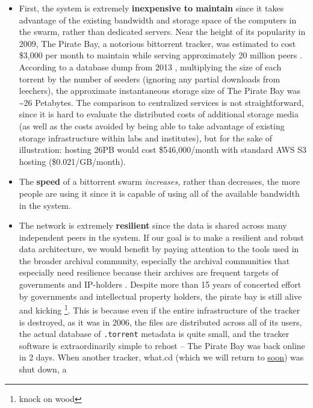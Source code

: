 \documentclass[10pt]{article}
\begin{document}
\begin{multicols}{2}
\begin{itemize}
\item
  First, the system is extremely \textbf{inexpensive to maintain} since
  it takes advantage of the existing bandwidth and storage space of the
  computers in the swarm, rather than dedicated servers. Near the height
  of its popularity in 2009, The Pirate Bay, a notorious bittorrent
  tracker, was estimated to cost \$3,000 per month to maintain while
  serving approximately 20 million peers \cite{roettgersPirateBayDistributing2009} . According to a database dump
  from 2013 \cite{PirateBayArchiveteam2020} , multiplying the
  size of each torrent by the number of seeders (ignoring any partial
  downloads from leechers), the approximate instantaneous storage size
  of The Pirate Bay was \textasciitilde26 Petabytes. The comparison to
  centralized services is not straightforward, since it is hard to
  evaluate the distributed costs of additional storage media (as well as
  the costs avoided by being able to take advantage of existing storage
  infrastructure within labs and institutes), but for the sake of
  illustration: hosting 26PB would cost \$546,000/month with standard
  AWS S3 hosting (\$0.021/GB/month).
\item
  The \textbf{speed} of a bittorrent swarm \emph{increases,} rather than
  decreases, the more people are using it since it is capable of using
  all of the available bandwidth in the system.
\item
  The network is extremely \textbf{resilient} since the data is shared
  across many independent peers in the system. If our goal is to make a
  resilient and robust data architecture, we would benefit by paying
  attention to the tools used in the broader archival community,
  especially the archival communities that especially need resilience
  because their archives are frequent targets of governments and
  IP-holders\cite{spiesDataIntegrityLibrarians2017} . Despite
  more than 15 years of concerted effort by governments and intellectual
  property holders, the pirate bay is still alive and kicking \cite{kim15YearsPirate2019} \footnote{knock on wood}. This is because
  even if the entire infrastructure of the tracker is destroyed, as it
  was in 2006, the files are distributed across all of its users, the
  actual database of \texttt{.torrent} metadata is quite small, and the
  tracker software is extraordinarily simple to rehost \cite{vandersarOpenBayNow2014}  -- The Pirate Bay was back online in 2
  days. When another tracker, what.cd (which we will return to
  \protect\hyperlink{archives-need-communities}{soon}) was shut down, a

\end{itemize}
\end{multicols}
\end{document}
